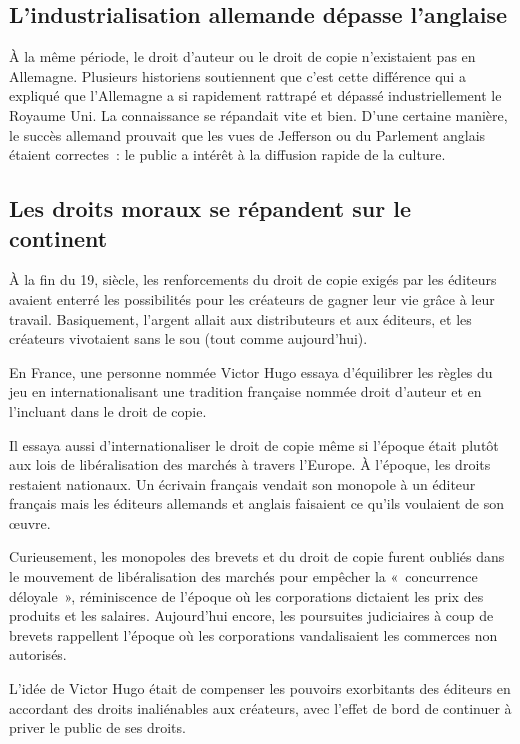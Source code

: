 \subsection{L'industrialisation allemande dépasse l'anglaise}
À la même période, le droit d'auteur ou le droit de copie n'existaient pas en Allemagne. Plusieurs historiens soutiennent
que c'est cette différence qui a expliqué que
l'Allemagne a si rapidement
rattrapé et dépassé industriellement le Royaume Uni. La connaissance se répandait vite et bien. D'une certaine manière, le succès allemand prouvait que les vues de Jefferson ou du Parlement anglais
étaient correctes~: le public a intérêt à la diffusion rapide de la culture.

\subsection{Les droits moraux se répandent sur le continent}
À la fin du 19\ieme, siècle, les renforcements du droit de copie exigés par les éditeurs avaient enterré les possibilités pour les créateurs de gagner leur vie grâce
à leur travail. Basiquement, l'argent allait aux distributeurs et aux éditeurs, et les créateurs vivotaient sans le sou (tout comme aujourd'hui). 

En France, une personne nommée Victor Hugo essaya d'équilibrer les règles du jeu en internationalisant une tradition française nommée droit d'auteur et en l'incluant dans le droit de
copie.

Il essaya aussi d'internationaliser le droit de copie même si l'époque était plutôt aux lois de libéralisation des marchés à travers l'Europe. À l'époque, les droits
restaient nationaux. Un écrivain
français vendait son monopole à un éditeur français mais les éditeurs allemands et anglais faisaient ce qu'ils voulaient de son œuvre.

Curieusement, les monopoles des brevets et du droit de copie furent oubliés dans le mouvement de libéralisation des marchés pour empêcher la «~concurrence déloyale~», réminiscence de l'époque
où les corporations dictaient les prix des produits et les salaires. Aujourd'hui encore, les poursuites judiciaires à coup de brevets rappellent l'époque où les corporations
vandalisaient les commerces non autorisés.

L'idée de Victor Hugo était de compenser les pouvoirs exorbitants des éditeurs en accordant des droits inaliénables aux créateurs, avec l'effet de bord de continuer à priver le public de ses droits.

